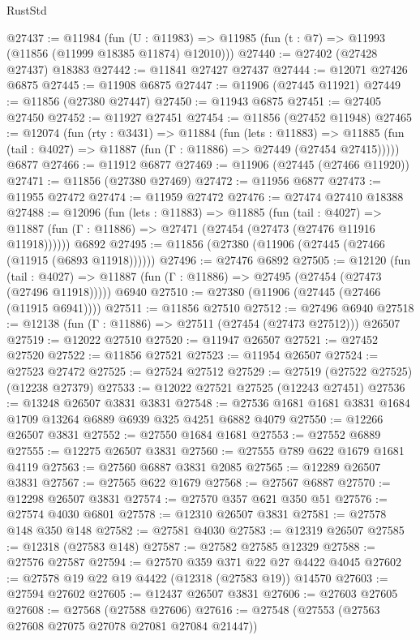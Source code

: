 \begin{lexlean}{RustStd}
\begin{coremodule}
@27437 := @11984
    (fun (U : @11983) => @11985 (fun (t : @7) => @11993 (@11856 (@11999 @18385 @11874) @12010)))
@27440 := @27402 (@27428 @27437) @18383
@27442 := @11841 @27427 @27437
@27444 := @12071 @27426 @6875
@27445 := @11908 @6875
@27447 := @11906 (@27445 @11921)
@27449 := @11856 (@27380 @27447)
@27450 := @11943 @6875
@27451 := @27405 @27450
@27452 := @11927 @27451
@27454 := @11856 (@27452 @11948)
@27465 := @12074
    (fun (rty : @3431) =>
    @11884
      (fun (lets : @11883) =>
      @11885 (fun (tail : @4027) => @11887 (fun (Γ : @11886) => @27449 (@27454 @27415)))))
    @6877
@27466 := @11912 @6877
@27469 := @11906 (@27445 (@27466 @11920))
@27471 := @11856 (@27380 @27469)
@27472 := @11956 @6877
@27473 := @11955 @27472
@27474 := @11959 @27472
@27476 := @27474 @27410 @18388
@27488 := @12096
    (fun (lets : @11883) =>
    @11885
      (fun (tail : @4027) =>
      @11887 (fun (Γ : @11886) => @27471 (@27454 (@27473 (@27476 @11916 @11918))))))
    @6892
@27495 := @11856 (@27380 (@11906 (@27445 (@27466 (@11915 (@6893 @11918))))))
@27496 := @27476 @6892
@27505 := @12120
    (fun (tail : @4027) => @11887 (fun (Γ : @11886) => @27495 (@27454 (@27473 (@27496 @11918)))))
    @6940
@27510 := @27380 (@11906 (@27445 (@27466 (@11915 @6941))))
@27511 := @11856 @27510
@27512 := @27496 @6940
@27518 := @12138 (fun (Γ : @11886) => @27511 (@27454 (@27473 @27512))) @26507
@27519 := @12022 @27510
@27520 := @11947 @26507
@27521 := @27452 @27520
@27522 := @11856 @27521
@27523 := @11954 @26507
@27524 := @27523 @27472
@27525 := @27524 @27512
@27529 := @27519 (@27522 @27525) (@12238 @27379)
@27533 := @12022 @27521 @27525 (@12243 @27451)
@27536 := @13248 @26507 @3831 @3831
@27548 := @27536 @1681 @1681 @3831 @1684 @1709 @13264 @6889 @6939 @325 @4251 @6882 @4079
@27550 := @12266 @26507 @3831
@27552 := @27550 @1684 @1681
@27553 := @27552 @6889
@27555 := @12275 @26507 @3831
@27560 := @27555 @789 @622 @1679 @1681 @4119
@27563 := @27560 @6887 @3831 @2085
@27565 := @12289 @26507 @3831
@27567 := @27565 @622 @1679
@27568 := @27567 @6887
@27570 := @12298 @26507 @3831
@27574 := @27570 @357 @621 @350 @51
@27576 := @27574 @4030 @6801
@27578 := @12310 @26507 @3831
@27581 := @27578 @148 @350 @148
@27582 := @27581 @4030
@27583 := @12319 @26507
@27585 := @12318 (@27583 @148)
@27587 := @27582 @27585 @12329
@27588 := @27576 @27587
@27594 := @27570 @359 @371 @22 @27 @4422 @4045
@27602 := @27578 @19 @22 @19 @4422 (@12318 (@27583 @19)) @14570
@27603 := @27594 @27602
@27605 := @12437 @26507 @3831
@27606 := @27603 @27605
@27608 := @27568 (@27588 @27606)
@27616 := @27548 (@27553 (@27563 @27608 @27075 @27078 @27081 @27084 @21447))

\end{coremodule}
\end{lexlean}
